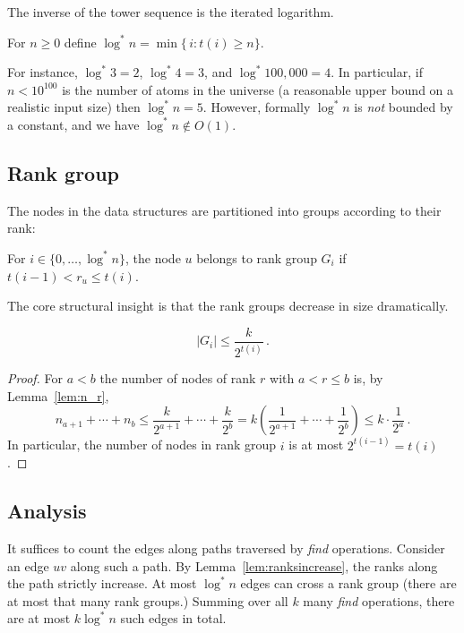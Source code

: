 \documentclass{tstextbook}
\begin{document}
The inverse of the tower sequence is the iterated logarithm.
\begin{definition}
  For $n\geq 0$ define
  $\log^* n =  \min\{\, i \colon t(i) \geq n\}$.
\end{definition}

For instance, $\log^* 3= 2$, $\log^* 4 = 3$, and $\log^* 100,000 = 4$.
In particular, if $n<10^{100}$ is the number of atoms in the universe (a reasonable upper bound on a realistic input size) then $\log^* n =5$.
However, formally $\log^* n$ is \emph{not} bounded by a constant, and we have $\log^* n \notin O(1)$.

\subsection{Rank group}

The nodes in the data structures are partitioned into groups according to their rank:
\begin{definition}
  For $i\in \{0,\ldots, \log^*n\}$, the node $u$ belongs to rank group $G_i$ if $t(i-1) < r_u \leq t(i)$.
\end{definition}

The core structural insight is that the rank groups decrease in size dramatically.

\begin{lemma}
  \[|G_i| \leq \frac{k}{2^{t(i)}}\,.\]
\end{lemma}
\begin{proof}
  For $a<b$ the number of nodes of rank $r$ with $a< r\leq b$ is, by Lemma~\ref{lem:n_r},
  \[ n_{a+1} +\cdots + n_b \leq \frac{k}{2^{a+1}} + \cdots + \frac{k}{2^b} =
  k\left(\frac{1}{2^{a+1}} + \cdots + \frac{1}{2^b}\right) \leq
  k\cdot \frac{1}{2^a}\,.
  \]
  In particular, the number of nodes in rank group $i$ is at most $2^{t(i-1)} = t(i)$.
\end{proof}

\subsection{Analysis}

It suffices to count the edges along paths traversed by \emph{find} operations.
Consider an edge $uv$ along such a path.
By Lemma~\ref{lem:ranksincrease}, the ranks along the path strictly increase.
At most $\log^* n$ edges can cross a rank group (there are at most that many rank groups.)
Summing over all $k$ many \emph{find} operations, there are at most $k\log^* n$ such edges in total.
\end{document}
